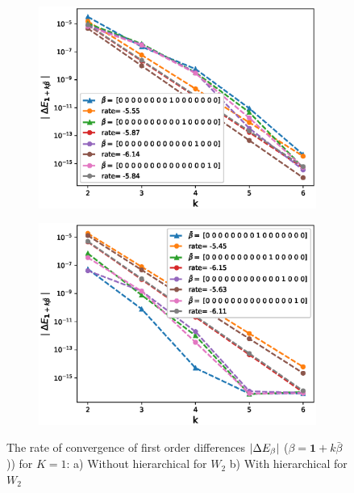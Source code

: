 \documentclass[11pt]{article}
\begin{document}
\begin{figure}[h!]
	\centering
	\begin{subfigure}{.5\textwidth}
		\centering
		\includegraphics[width=1\linewidth]{./figures/effect_H_differences/hierarchical/H_007/N_8/first_difference_rbergomi_8steps_H_007_K_1_hierarch_with_rate_W2.eps}
		\caption{}
		\label{fig:sub3}
	\end{subfigure}%
	\begin{subfigure}{.5\textwidth}
		\centering
		\includegraphics[width=1\linewidth]{./figures/effect_H_differences/total_hierarchical/first_difference_rbergomi_8steps_H_007_K_1_totally_hierarch_with_rate_W2}
		\caption{}
		\label{fig:sub4}
	\end{subfigure}
	
	\caption{The rate of convergence of  first order differences $\left\lvert\Delta E_{\beta}\right\rvert$ ($\beta=\mathbf{1}+k \bar{\beta}$)) for $K=1$: a) Without hierarchical for $W_2$ b) With hierarchical for $W_2$}
	\label{fig:test2}
\end{figure}
\end{document}
